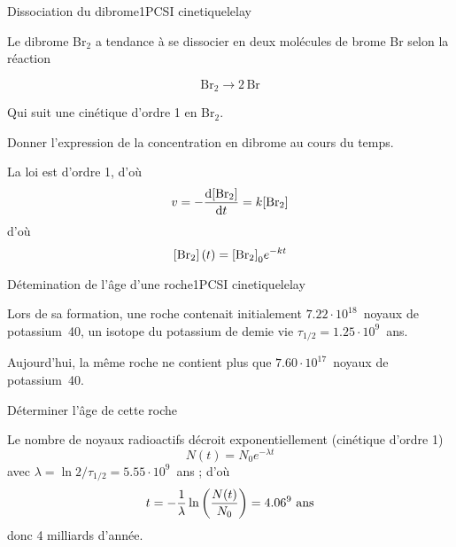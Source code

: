 
\begin{exercise}{Dissociation du dibrome}{1}{PCSI}
{cinetique}{lelay}

Le dibrome Br$_2$ a tendance à se dissocier en deux molécules de brome Br selon la réaction

$$ \text{Br}_2 \longrightarrow 2\, \text{Br} $$

Qui suit une cinétique d'ordre 1 en Br$_2$.

\begin{questions}

    \question Donner l'expression de la concentration en dibrome au cours du temps.
    
\end{questions}
\end{exercise}

\begin{solution}
\begin{questions}

    \question La loi est d'ordre 1, d'où
    $$ v = - \dv{\qty[\text{Br}_2]}{t} = k \qty[\text{Br}_2]$$
    d'où
    $$ \qty[\text{Br}_2](t) = \qty[\text{Br}_2]_0 e^{-kt}$$
    
\end{questions}
\end{solution}


\begin{exercise}{Détemination de l'âge d'une roche}{1}{PCSI}
{cinetique}{lelay}

Lors de sa formation, une roche contenait initialement $7.22\cdot 10^{18}$~noyaux de potassium~40, un isotope du potassium de demie vie $\tau_{1/2} = 1.25\cdot 10^9$~ans.

Aujourd'hui, la même roche ne contient plus que $7.60\cdot 10^{17}$~noyaux de potassium~40.

\begin{questions}

    \question Déterminer l'âge de cette roche
    
\end{questions}
\end{exercise}

\begin{solution}
\begin{questions}

    \question Le nombre de noyaux radioactifs décroit exponentiellement (cinétique d'ordre 1)
    $$ N(t) = N_0 e^{-\lambda t}$$
    avec $\lambda = \ln 2 / \tau_{1/2} = 5.55\cdot 10^{9}$~ans ; d'où
    $$ t = -\frac1\lambda \ln\qty(\frac{N(t)}{N_0}) = 4.06 \time 10^9\text{ ans}$$
    donc 4 milliards d'année.
    
\end{questions}
\end{solution}

